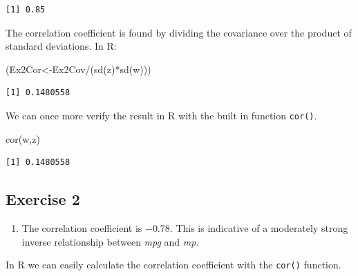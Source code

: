 \documentclass[
  letterpaper,
  DIV=11,
  numbers=noendperiod]{scrreprt}
\newenvironment{Shaded}{\begin{snugshade}}{\end{snugshade}}
\newcommand{\FunctionTok}[1]{\textcolor[rgb]{0.28,0.35,0.67}{#1}}
\newcommand{\NormalTok}[1]{\textcolor[rgb]{0.00,0.23,0.31}{#1}}
\newcommand{\OtherTok}[1]{\textcolor[rgb]{0.00,0.23,0.31}{#1}}
\newcommand{\SpecialCharTok}[1]{\textcolor[rgb]{0.37,0.37,0.37}{#1}}
\providecommand{\tightlist}{%
  \setlength{\itemsep}{0pt}\setlength{\parskip}{0pt}}\usepackage{longtable,booktabs,array}
\begin{document}
\begin{verbatim}
[1] 0.85
\end{verbatim}

The correlation coefficient is found by dividing the covariance over the
product of standard deviations. In R:

\begin{Shaded}
\begin{Highlighting}[numbers=left,,]
\NormalTok{(Ex2Cor}\OtherTok{\textless{}{-}}\NormalTok{Ex2Cov}\SpecialCharTok{/}\NormalTok{(}\FunctionTok{sd}\NormalTok{(z)}\SpecialCharTok{*}\FunctionTok{sd}\NormalTok{(w)))}
\end{Highlighting}
\end{Shaded}

\begin{verbatim}
[1] 0.1480558
\end{verbatim}

We can once more verify the result in R with the built in function
\texttt{cor()}.

\begin{Shaded}
\begin{Highlighting}[numbers=left,,]
\FunctionTok{cor}\NormalTok{(w,z)}
\end{Highlighting}
\end{Shaded}

\begin{verbatim}
[1] 0.1480558
\end{verbatim}

\hypertarget{exercise-2-11}{%
\subsection*{Exercise 2}\label{exercise-2-11}}

\begin{enumerate}
\def\labelenumi{\arabic{enumi}.}
\tightlist
\item
  The correlation coefficient is \(-0.78\). This is indicative of a
  moderately strong inverse relationship between \emph{mpg} and
  \emph{mp}.
\end{enumerate}

In R we can easily calculate the correlation coefficient with the
\texttt{cor()} function.

\begin{Shaded}
\end{Shaded}
\end{document}
